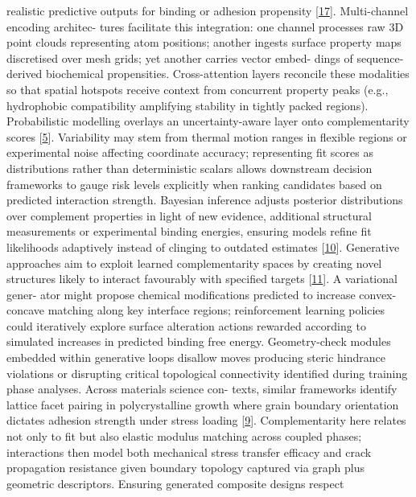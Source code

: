 \documentclass[
]{article}
\begin{document}
realistic predictive outputs for binding or adhesion propensity
{[}\protect\hyperlink{_bookmark57}{17}{]}. Multi-channel encoding
architec- tures facilitate this integration: one channel processes raw
3D point clouds representing atom positions; another ingests surface
property maps discretised over mesh grids; yet another carries vector
embed- dings of sequence-derived biochemical propensities.
Cross-attention layers reconcile these modalities so that spatial
hotspots receive context from concurrent property peaks (e.g.,
hydrophobic compatibility amplifying stability in tightly packed
regions). Probabilistic modelling overlays an uncertainty-aware layer
onto complementarity scores {[}\protect\hyperlink{_bookmark45}{5}{]}.
Variability may stem from thermal motion ranges in flexible regions or
experimental noise affecting coordinate accuracy; representing fit
scores as distributions rather than deterministic scalars allows
downstream decision frameworks to gauge risk levels explicitly when
ranking candidates based on predicted interaction strength. Bayesian
inference adjusts posterior distributions over complement properties in
light of new evidence, additional structural measurements or
experimental binding energies, ensuring models refine fit likelihoods
adaptively instead of clinging to outdated estimates
{[}\protect\hyperlink{_bookmark50}{10}{]}. Generative approaches aim to
exploit learned complementarity spaces by creating novel structures
likely to interact favourably with specified targets
{[}\protect\hyperlink{_bookmark51}{11}{]}. A variational gener- ator
might propose chemical modifications predicted to increase
convex-concave matching along key interface regions; reinforcement
learning policies could iteratively explore surface alteration actions
rewarded according to simulated increases in predicted binding free
energy. Geometry-check modules embedded within generative loops disallow
moves producing steric hindrance violations or disrupting critical
topological connectivity identified during training phase analyses.
Across materials science con- texts, similar frameworks identify lattice
facet pairing in polycrystalline growth where grain boundary orientation
dictates adhesion strength under stress loading
{[}\protect\hyperlink{_bookmark49}{9}{]}. Complementarity here relates
not only to fit but also elastic modulus matching across coupled phases;
interactions then model both mechanical stress transfer efficacy and
crack propagation resistance given boundary topology captured via graph
plus geometric descriptors. Ensuring generated composite designs respect
\end{document}
